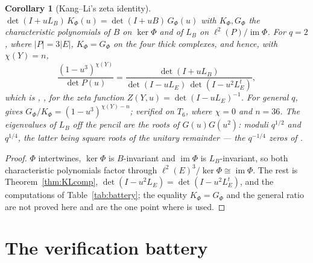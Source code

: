 \documentclass[11pt]{amsart}
\numberwithin{equation}{section}
\newtheorem{corollary}[theorem]{Corollary}
\theoremstyle{definition}
\theoremstyle{remark}
\newcommand{\LE}{L_E}
\newcommand{\LB}{L_B}
\newcommand{\im}{\operatorname{im}}
\begin{document}
\begin{corollary}[Kang--Li's zeta identity]\label{cor:KL}
$\det(I+u\LB)\,K_\Phi(u)=\det(I+uB)\,G_\Phi(u)$ with $K_\Phi,G_\Phi$ the characteristic
polynomials of $B$ on $\ker\Phi$ and of $\LB$ on $\ell^{2}(P)/\im\Phi$. For $q=2$, where
$|P|=3|E|$, $K_\Phi=G_\Phi$ on the four thick complexes, and hence, with $\chi(Y)=n$,
\[
\frac{(1-u^{3})^{\chi(Y)}}{\det P(u)}=\frac{\det(I+u\LB)}{\det(I-u\LE)\,\det(I-u^{2}\LE^{t})},
\]
which is \cite[Thm.~C]{KL}, \cite[eq.~(1.6)]{KLW}, for the zeta function
$Z(Y,u)=\det(I-u\LE)^{-1}$. For general $q$, \cite{KL} gives
$G_\Phi/K_\Phi=(1-u^{3})^{\chi(Y)-n}$; verified on $T_6$, where $\chi=0$ and $n=36$. The
eigenvalues of $\LB$ off the pencil are the roots of $G(u)G(u^{2})$: moduli $q^{1/2}$ and
$q^{1/4}$, the latter being square roots of the unitary remainder --- the $q^{-1/4}$ zeros
of \cite[Thm.~1.5.1(4)]{KLW}.
\end{corollary}

\begin{proof}
$\Phi$ intertwines, $\ker\Phi$ is $B$-invariant and $\im\Phi$ is $\LB$-invariant, so both
characteristic polynomials factor through $\ell^{2}(E)^{3}/\ker\Phi\cong\im\Phi$. The rest is
Theorem~\ref{thm:KLcomp}, $\det(I-u^{2}\LE)=\det(I-u^{2}\LE^{t})$, and the computations of
Table~\ref{tab:battery}; the equality $K_\Phi=G_\Phi$ and the general ratio are not proved
here and are the one point where \cite{KL} is used.
\end{proof}

\section{The verification battery}\label{sec:battery}
\end{document}
